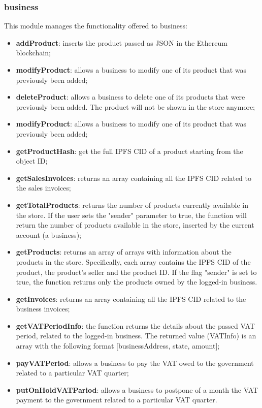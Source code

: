 \subsubsection{business}
This module manages the functionality offered to business:
\begin{itemize}
	\item \textbf{addProduct}: inserts the product passed as JSON in the Ethereum blockchain; 
	\item \textbf{modifyProduct}: allows a business to modify one of its product that was previously been added;
	\item \textbf{deleteProduct}: allows a business to delete one of its products that were previously been added. The product will not be shown in the store anymore;
	\item \textbf{modifyProduct}: allows a business to modify one of its product that was previously been added;
	\item \textbf{getProductHash}: get the full IPFS CID of a product starting from the object ID;
	\item \textbf{getSalesInvoices}: returns an array containing all the IPFS CID related to the sales invoices;
	\item \textbf{getTotalProducts}: returns the number of products currently available in the store. If the user sets the "sender" parameter to true, the function will return the number of products available in the store, inserted by the current account (a business);
	\item \textbf{getProducts}: returns an array of arrays with information about the products in the store. Specifically, each array contains the IPFS CID of the product, the product's seller and the product ID. If the flag "sender" is set to true, the function returns only the products owned by the logged-in business.
	\item \textbf{getInvoices}: returns an array containing all the IPFS CID related to the business invoices;
	\item \textbf{getVATPeriodInfo}: the function returns the details about the passed VAT period, related to the logged-in business. The returned value (VATInfo) is an array with the following format [businessAddress, state, amount];
	\item \textbf{payVATPeriod}: allows a business to pay the VAT owed to the government related to a particular VAT quarter;
	\item \textbf{putOnHoldVATPariod}: allows a business to postpone of a month the VAT payment to the government related to a particular VAT quarter.
	
\end{itemize}
